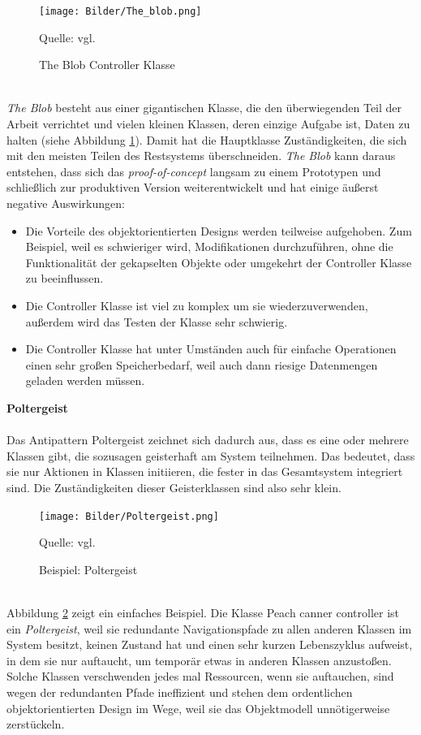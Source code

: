 \documentclass[fontsize=11pt,a4paper,final]{scrreprt}[2003/01/01]
\newcommand*{\quelle}{%
	\footnotesize Quelle: 
}
\begin{document}
\begin{figure}[H]
	\centering
	\texttt{[image: Bilder/The\_blob.png]}
	\caption{The Blob Controller Klasse}
	\quelle{vgl. \cite[S. 43]{Brown1998}}
	\label{fig:The_blob}
\end{figure} \ \\
\textit{The Blob} besteht aus einer gigantischen Klasse, die den überwiegenden Teil der Arbeit verrichtet und vielen kleinen Klassen, deren einzige Aufgabe ist, Daten zu halten (siehe Abbildung \ref{fig:The_blob}). Damit hat die Hauptklasse Zuständigkeiten, die sich mit den meisten Teilen des Restsystems überschneiden. \textit{The Blob} kann daraus entstehen, dass sich das \textit{proof-of-concept} langsam zu einem Prototypen und schließlich zur produktiven Version weiterentwickelt und hat einige äußerst negative Auswirkungen:
\begin{itemize}
	\item Die Vorteile des objektorientierten Designs werden teilweise aufgehoben. Zum Beispiel, weil es schwieriger wird, Modifikationen durchzuführen, ohne die Funktionalität der gekapselten Objekte oder umgekehrt der Controller Klasse zu beeinflussen.
	\item Die Controller Klasse ist viel zu komplex um sie wiederzuverwenden, außerdem wird das Testen der Klasse sehr schwierig.
	\item Die Controller Klasse hat unter Umständen auch für einfache Operationen einen sehr großen Speicherbedarf, weil auch dann riesige Datenmengen geladen werden müssen.
\end{itemize} \newpage \noindent
\textbf{Poltergeist \cite[S. 58 - 61]{Brown1998}} \\ \\
Das Antipattern Poltergeist zeichnet sich dadurch aus, dass es eine oder mehrere Klassen gibt, die sozusagen \glqq geisterhaft\grqq{} am System teilnehmen. Das bedeutet, dass sie nur Aktionen in Klassen initiieren, die fester in das Gesamtsystem integriert sind. Die Zuständigkeiten dieser \glqq Geisterklassen\grqq{} sind also sehr klein.

\begin{figure}[H]
	\centering
	\texttt{[image: Bilder/Poltergeist.png]}
	\caption{Beispiel: Poltergeist}
	\quelle{vgl. \cite[S. 59]{Brown1998}}
	\label{fig:Poltergeist}
\end{figure} \ \\
Abbildung \ref{fig:Poltergeist} zeigt ein einfaches Beispiel. Die Klasse \glqq Peach canner controller\grqq{} ist ein \textit{Poltergeist}, weil sie redundante Navigationspfade zu allen anderen Klassen im System besitzt, keinen Zustand hat und einen sehr kurzen Lebenszyklus aufweist, in dem sie nur auftaucht, um temporär etwas in anderen Klassen anzustoßen. Solche Klassen verschwenden jedes mal Ressourcen, wenn sie auftauchen, sind wegen der redundanten Pfade ineffizient und stehen dem ordentlichen objektorientierten Design im Wege, weil sie das Objektmodell unnötigerweise zerstückeln. 
\end{document}
